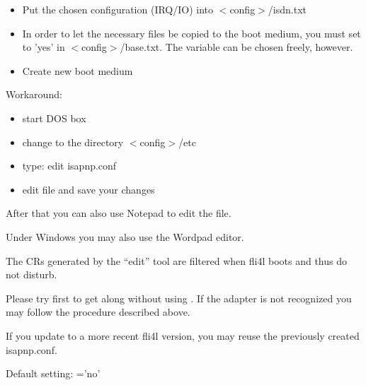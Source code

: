 \begin{itemize}
  \item Put the chosen configuration (IRQ/IO) into $<$config$>$/isdn.txt
  \item In order to let the necessary files be copied to the boot medium, you
    must set  to 'yes' in $<$config$>$/base.txt. The variable
     can be chosen freely, however.
  \item Create new boot medium
  \end{itemize}

  Workaround:
  \begin{itemize}
  \item start DOS box
  \item change to the directory $<$config$>$/etc
  \item type:
    edit isapnp.conf
  \item edit file and save your changes
  \end{itemize}
  After that you can also use Notepad to edit the file.

  Under Windows you may also use the Wordpad editor.

  The CRs generated by the ``edit'' tool are filtered when fli4l boots and thus
  do not disturb.

  Please try first to get along without using . If the
  adapter is not recognized you may follow the procedure described
  above.

  If you update to a more recent fli4l version, you may reuse the previously
  created \hbox{isapnp.conf}.

  Default setting: ='no'


